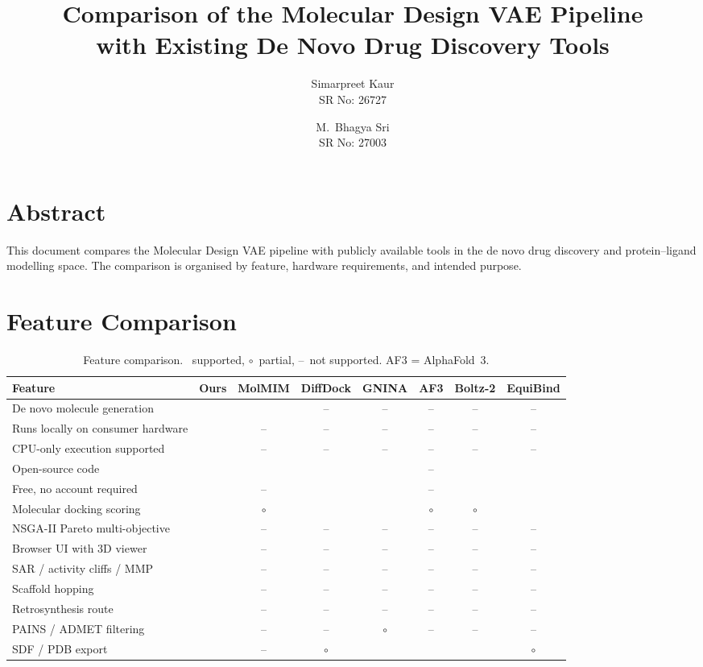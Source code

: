 \documentclass[11pt,a4paper]{article}
\title{Comparison of the Molecular Design VAE Pipeline\\
       with Existing De Novo Drug Discovery Tools}
\author{Simarpreet Kaur\\\small SR No: 26727 \and
        M.\ Bhagya Sri\\\small SR No: 27003}
\date{}
\newcommand{\yes}{\checkmark}
\newcommand{\no}{--}
\newcommand{\partsupp}{$\circ$}
\begin{document}
\maketitle

\section*{Abstract}
This document compares the Molecular Design VAE pipeline with publicly
available tools in the de novo drug discovery and protein--ligand modelling
space. The comparison is organised by feature, hardware requirements, and
intended purpose.

\section{Feature Comparison}

\begin{table}[h]
\centering
\small
\setlength{\tabcolsep}{4pt}
\renewcommand{\arraystretch}{1.2}
\begin{tabular}{p{6.5cm} c c c c c c c}
\toprule
\textbf{Feature} & \textbf{Ours} & \textbf{MolMIM} & \textbf{DiffDock} & \textbf{GNINA} & \textbf{AF3} & \textbf{Boltz-2} & \textbf{EquiBind}\\
\midrule
De novo molecule generation         & \yes & \yes & \no & \no & \no & \no & \no \\
Runs locally on consumer hardware   & \yes & \no  & \no & \no & \no & \no & \no \\
CPU-only execution supported        & \yes & \no  & \no & \no & \no & \no & \no \\
Open-source code                    & \yes & \yes & \yes & \yes & \no & \yes & \yes \\
Free, no account required           & \yes & \no  & \yes & \yes & \no & \yes & \yes \\
Molecular docking scoring           & \yes & \partsupp & \yes & \yes & \partsupp & \partsupp & \yes \\
NSGA-II Pareto multi-objective      & \yes & \no  & \no & \no & \no & \no & \no \\
Browser UI with 3D viewer           & \yes & \no  & \no & \no & \no & \no & \no \\
SAR / activity cliffs / MMP         & \yes & \no  & \no & \no & \no & \no & \no \\
Scaffold hopping                    & \yes & \no  & \no & \no & \no & \no & \no \\
Retrosynthesis route                & \yes & \no  & \no & \no & \no & \no & \no \\
PAINS / ADMET filtering             & \yes & \no  & \no & \partsupp & \no & \no & \no \\
SDF / PDB export                    & \yes & \no  & \partsupp & \yes & \yes & \yes & \partsupp \\
\bottomrule
\end{tabular}
\caption{Feature comparison. \yes\ supported, \partsupp\ partial, \no\ not supported.
AF3 = AlphaFold~3.}
\end{table}
\end{document}
